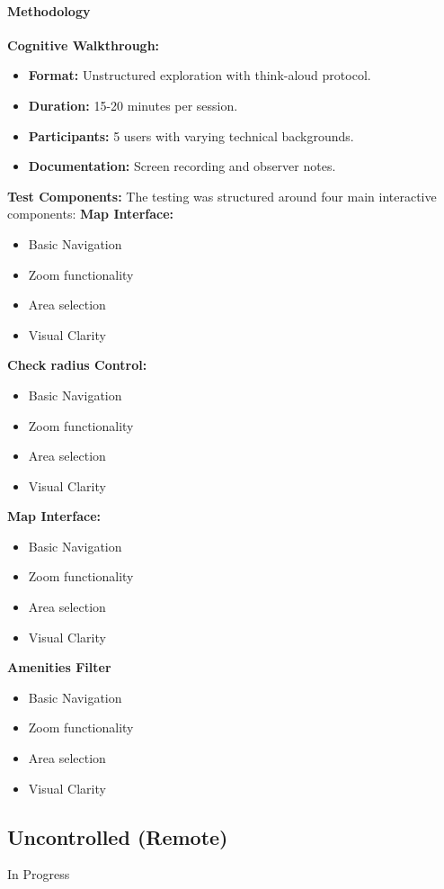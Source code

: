 \documentclass{report}
\begin{document}
\paragraph{Methodology}  
\textbf{Cognitive Walkthrough:}
\begin{itemize}
    \item \textbf{Format: } Unstructured exploration with think-aloud protocol.
    \item \textbf{Duration: } 15-20 minutes per session.
    \item \textbf{Participants: } 5 users with varying technical backgrounds.
    \item \textbf{Documentation: } Screen recording and observer notes.
\end{itemize}
\textbf{Test Components: }
The testing was structured around four main interactive components:
\textbf{Map Interface:}
\begin{itemize}
    \item Basic Navigation
    \item Zoom functionality
    \item Area selection
    \item Visual Clarity
\end{itemize}
\textbf{Check radius Control:}
\begin{itemize}
    \item Basic Navigation
    \item Zoom functionality
    \item Area selection
    \item Visual Clarity
\end{itemize}
\textbf{Map Interface:}
\begin{itemize}
    \item Basic Navigation
    \item Zoom functionality
    \item Area selection
    \item Visual Clarity
\end{itemize}
\textbf{Amenities Filter}
\begin{itemize}
    \item Basic Navigation
    \item Zoom functionality
    \item Area selection
    \item Visual Clarity
\end{itemize}



\subsection{Uncontrolled (Remote)}
In Progress
\end{document}
